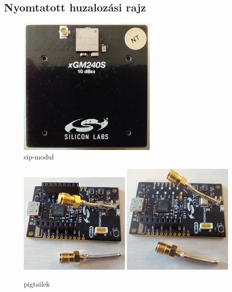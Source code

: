         \subsection{Nyomtatott huzalozási rajz}
            \begin{figure}
                \centering
                \includegraphics[width=0.6\textwidth]{kep/szerkesztett/sip-modul.jpg}
                \caption{sip-modul}
                \label{fig:sip}
            \end{figure}
%
            \begin{figure}
                \centering
                \includegraphics[width=0.48\textwidth]{kep/szerkesztett/pigtail1.jpg}
                \includegraphics[width=0.48\textwidth]{kep/szerkesztett/pigtail2.jpg}
                \caption{pigtailek}
                \label{fig:pigtail}
            \end{figure}
